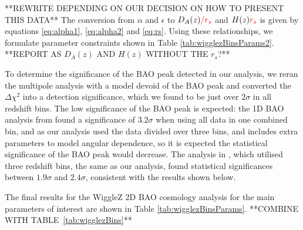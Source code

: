 \documentclass[iop,twocolappendix]{emulateapj}
\newcommand{\green}{\color{green}}
\newcommand{\red}{\color{red}}
\begin{document}

{\green  **REWRITE DEPENDING ON OUR DECISION ON HOW TO PRESENT THIS DATA**
The conversion from $\alpha$ and $\epsilon$ to $D_A(z){\red /r_s}$ and $H(z) {\red r_s}$ is given by equations \eqref{eq:alpha1}, \eqref{eq:alpha2} and \eqref{eq:rs}. Using these relationships, we formulate parameter constraints shown in {\red Table \ref{tab:wigglezBinsParams2}. **REPORT AS $D_A(z)$ AND $H(z)$ WITHOUT THE $r_s$?**} }

To determine the significance of the BAO peak detected in our analysis, we reran the multipole analysis with a model devoid of the BAO peak and converted the $\Delta \chi^2$ into a detection significance, which we found to be just over $2\sigma$ in all redshift bins. The low significance of the BAO peak is expected: the 1D BAO analysis from \citet{BlakeDavis2011} found a significance of $3.2\sigma$ when using all data in one combined bin, and as our analysis used the data divided over three bins, and includes extra parameters to model angular dependence, so it is expected the statistical significance of the BAO peak would decrease. The analysis in \citet{BlakeKazin2011}, which utilised three redshift bins, the same as our analysis, found statistical significances between $1.9\sigma$ and $2.4\sigma$, consistent with the results shown below.

The final results for the WiggleZ 2D BAO cosmology analysis for the main parameters of interest are shown in {\red Table \ref{tab:wigglezBinsParams}. **COMBINE WITH TABLE~\ref{tab:wigglezBins}**}
\end{document}
